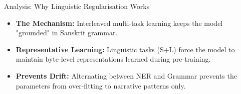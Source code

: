 \documentclass[10pt]{beamer}
\def\tpage{}
\newcommand{\tp}[1]{\def\tpage{#1}}
\begin{document}
\begin{frame}{Analysis: Why Linguistic Regularisation Works}
    \tp{43}
    \begin{itemize}
        \item \textbf{The Mechanism:} Interleaved multi-task learning keeps the model "grounded" in Sanskrit grammar.
        \item \textbf{Representative Learning:} Linguistic tasks (S+L) force the model to maintain byte-level representations learned during pre-training.
        \item \textbf{Prevents Drift:} Alternating between NER and Grammar prevents the parameters from over-fitting to narrative patterns only.
    \end{itemize}
    \vfill
    \begin{center}
    \end{center}
\end{frame}
\end{document}
